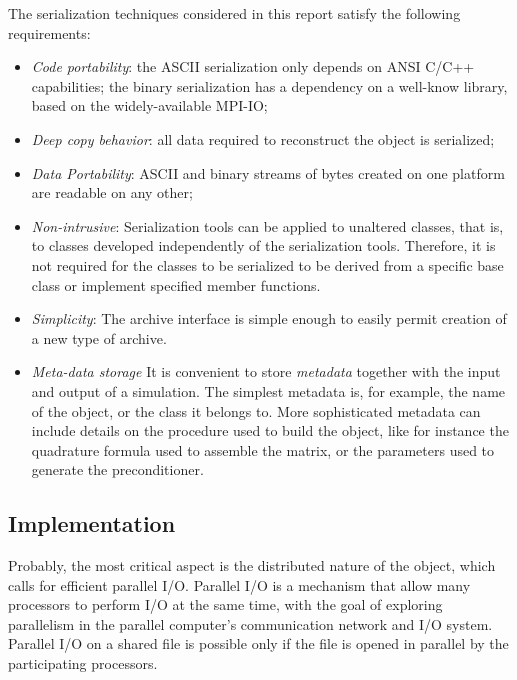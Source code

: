 \documentclass[11pt,relax]{SANDreport}
\begin{document}
The serialization techniques considered in this report satisfy the
following requirements:
\begin{itemize}
\item
{\sl Code portability}: the ASCII serialization only depends on ANSI
C/C++ capabilities; the binary serialization has a dependency on a well-know
library, based on the widely-available MPI-IO;
\item
{\sl Deep copy behavior}: all data required to reconstruct the object is
serialized;
\item
{\sl Data Portability}: ASCII and binary streams of bytes created on one
platform are readable on any other;
\item
{\sl Non-intrusive}: Serialization tools can be applied to unaltered classes,
  that is, to classes developed independently of the serialization tools.
        Therefore, it is not required for the classes to be serialized to be
        derived from a specific base class or implement specified member
        functions.
\item
{\sl Simplicity}: The archive interface is simple enough to easily permit
creation of a new type of archive.
\item
{\sl Meta-data storage}
It is convenient to store {\sl metadata} together with the input and
output of a simulation. The simplest metadata is, for example, the name of the
object, or the class it belongs to. More sophisticated metadata can include
details on the procedure used to build the object, like for instance the
quadrature formula used to assemble the matrix, or the parameters used to
generate the preconditioner.
\end{itemize}

\subsection{Implementation}

Probably, the most critical aspect is the distributed nature of the object,
  which calls for efficient parallel I/O.
Parallel I/O is a mechanism that allow many
processors to perform I/O at the same time, with the goal of exploring
parallelism in the parallel computer's communication network and I/O system.
Parallel I/O on a shared file is possible only if the file is opened in
parallel by the participating processors.
\end{document}
